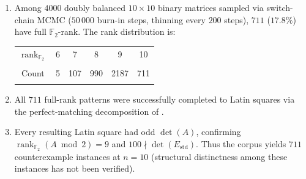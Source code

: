 \documentclass[11pt,a4paper]{article}
\newcommand{\FF}{\mathbb{F}}
\newcommand{\rank}{\operatorname{rank}}
\newcommand{\Estd}{E_{\mathrm{std}}}
\begin{document}
\begin{proposition}\label{prop:n10}
\begin{enumerate}[label=\textup{(\roman*)}]
  \item Among $4000$ doubly balanced $10\times 10$ binary matrices
        sampled via switch-chain MCMC ($50\,000$ burn-in steps,
        thinning every $200$ steps),
        $711$ ($17.8\%$) have full $\FF_2$-rank.
        The rank distribution is:
        \begin{center}
        \begin{tabular}{cccccc}
          \toprule
          $\rank_{\FF_2}$ & 6 & 7 & 8 & 9 & 10 \\\\
          \midrule
          Count & 5 & 107 & 990 & 2187 & 711 \\\\
          \bottomrule
        \end{tabular}
        \end{center}
  \item All $711$ full-rank patterns were successfully completed to
        Latin squares via the perfect-matching decomposition of
        .
  \item Every resulting Latin square had odd $\det(A)$, confirming
        $\rank_{\FF_2}(A\bmod 2)=9$ and $100\nmid\det(\Estd)$.
        Thus the corpus yields $711$ counterexample instances
        at $n=10$ (structural distinctness among these instances
        has not been verified).
\end{enumerate}
\end{proposition}
\end{document}
